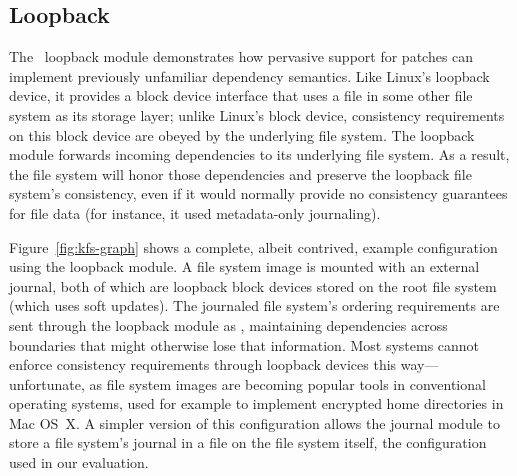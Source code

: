 



\subsection{Loopback}
\label{sec:modules:loop}

The \Featherstitch\ loopback module demonstrates how pervasive
support for patches can implement previously unfamiliar dependency
semantics.
%
Like Linux's loopback device, it provides a block device interface that
uses a file in some other file system as its storage layer; unlike Linux's
block device, consistency requirements on this block device are obeyed by
the underlying file system.
%
The loopback module forwards incoming dependencies to its underlying file
system.
%
As a result, the file system will honor those dependencies and preserve the
loopback file system's consistency, even if it would normally
provide no consistency guarantees for file data (for instance, it used
metadata-only journaling).

Figure~\ref{fig:kfs-graph} shows a complete, albeit contrived, example
configuration using the loopback module.
%
A file system image is mounted with an external journal, both of
which are loopback block devices stored on the root file system (which uses
soft updates). The journaled file system's ordering requirements are sent
through the loopback module as \patches, maintaining dependencies
across boundaries that might otherwise lose that information. 
Most systems cannot enforce consistency requirements through loopback
devices this way---unfortunate, as file system images are becoming popular
tools in  conventional operating systems, used for example to implement
encrypted home directories in Mac OS~X.
%
A simpler version of this configuration allows the journal module to
store a file system's journal in a file on the file system itself, the
configuration used in our evaluation.



\begin{comment}
\subsection{Asynchronous writes}
\label{sec:modules:unlink}

Finally, we also wrote a trivial module that removes all dependencies from
incoming \patches, allowing the buffer cache to write blocks in any order.
%
This implements similar semantics to existing file systems like ext2 in
asynchronous write mode.
\end{comment}
